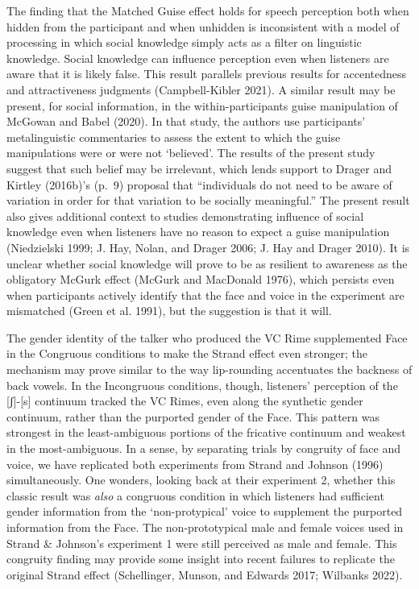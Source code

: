 \documentclass[
  letterpaper,
  DIV=11,
  numbers=noendperiod]{scrartcl}
\begin{document}
The finding that the Matched Guise effect holds for speech perception
both when hidden from the participant and when unhidden is inconsistent
with a model of processing in which social knowledge simply acts as a
filter on linguistic knowledge. Social knowledge can influence
perception even when listeners are aware that it is likely false. This
result parallels previous results for accentedness and attractiveness
judgments (Campbell-Kibler 2021). A similar result may be present, for
social information, in the within-participants guise manipulation of
McGowan and Babel (2020). In that study, the authors use participants'
metalinguistic commentaries to assess the extent to which the guise
manipulations were or were not `believed'. The results of the present
study suggest that such belief may be irrelevant, which lends support to
Drager and Kirtley (2016b)'s (p.~9) proposal that ``individuals do not
need to be aware of variation in order for that variation to be socially
meaningful.'' The present result also gives additional context to
studies demonstrating influence of social knowledge even when listeners
have no reason to expect a guise manipulation (Niedzielski 1999; J. Hay,
Nolan, and Drager 2006; J. Hay and Drager 2010). It is unclear whether
social knowledge will prove to be as resilient to awareness as the
obligatory McGurk effect (McGurk and MacDonald 1976), which persists
even when participants actively identify that the face and voice in the
experiment are mismatched (Green et al. 1991), but the suggestion is
that it will.

The gender identity of the talker who produced the VC Rime supplemented
Face in the Congruous conditions to make the Strand effect even
stronger; the mechanism may prove similar to the way lip-rounding
accentuates the backness of back vowels. In the Incongruous conditions,
though, listeners' perception of the {[}ʃ{]}-{[}s{]} continuum tracked
the VC Rimes, even along the synthetic gender continuum, rather than the
purported gender of the Face. This pattern was strongest in the
least-ambiguous portions of the fricative continuum and weakest in the
most-ambiguous. In a sense, by separating trials by congruity of face
and voice, we have replicated both experiments from Strand and Johnson
(1996) simultaneously. One wonders, looking back at their experiment 2,
whether this classic result was \emph{also} a congruous condition in
which listeners had sufficient gender information from the
`non-protypical' voice to supplement the purported information from the
Face. The non-prototypical male and female voices used in Strand \&
Johnson's experiment 1 were still perceived as male and female. This
congruity finding may provide some insight into recent failures to
replicate the original Strand effect (Schellinger, Munson, and Edwards
2017; Wilbanks 2022).
\end{document}
